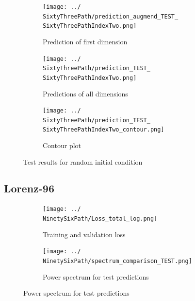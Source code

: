 	\begin{figure}[h]
		\centering
		\begin{subfigure}[b]{0.45\textwidth}
			\texttt{[image: ../\\SixtyThreePath/prediction\_augmend\_TEST\_\\SixtyThreePathIndexTwo.png]}
			\caption{Prediction of first dimension}
		\end{subfigure}
		\begin{subfigure}[b]{0.45\textwidth}
			\texttt{[image: ../\\SixtyThreePath/prediction\_TEST\_\\SixtyThreePathIndexTwo.png]}
			\caption{Predictions of all dimensions}
		\end{subfigure}
		\begin{subfigure}[b]{\textwidth}
			\texttt{[image: ../\\SixtyThreePath/prediction\_TEST\_\\SixtyThreePathIndexTwo\_contour.png]}
			\caption{Contour plot}
		\end{subfigure}
		\caption{Test results for random initial condition \SixtyThreePathIndexTwo}
		\label{63:predictions2}
	\end{figure}

	\FloatBarrier
	\subsection{Lorenz-96}
	\newcommand{\NinetySixPath}{Results/Lorenz-96/Figures/RNN-lstm-RDIM_10-N_used_100000-NUM-LAY_1-SIZE-LAY_100-ACT_tanh-ISH_statefull-SL_8-PL_2-LR_0.0001-DKP_1.0-ZKP_1.0-HSPL_300-IPL_200-NL_1-WID_0}
	\newcommand{\NinetySixPathIndexOne}{25172}
	\newcommand{\NinetySixPathIndexTwo}{50168}
	
		\begin{figure}[h]
		\centering
		\begin{subfigure}[b]{0.45\textwidth}
			\texttt{[image: ../\\NinetySixPath/Loss\_total\_log.png]}
			\caption{Training and validation loss}
			\label{96:loss}
		\end{subfigure}
		\begin{subfigure}[b]{0.45\textwidth}
			\texttt{[image: ../\\NinetySixPath/spectrum\_comparison\_TEST.png]}
			\caption{Power spectrum for test predictions}
			\label{96:spectrum}
		\end{subfigure}
	\end{figure}
	
